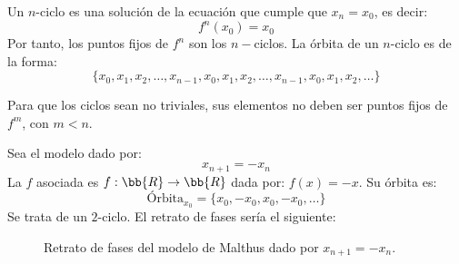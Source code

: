 \begin{definicion}[Ciclos]
Un $n$-ciclo es una solución de la ecuación que cumple que $x_n = x_0$, es decir:
$$f^n(x_0) = x_0$$
Por tanto, los puntos fijos de $f^n$ son los $n-$ciclos. La órbita de un $n$-ciclo es de la forma:
$$\{x_0, x_1, x_2, \ldots, x_{n-1}, x_0, x_1, x_2, \ldots, x_{n-1}, x_0, x_1, x_2, \ldots \}$$

Para que los ciclos sean no triviales, sus elementos no deben ser puntos fijos de $f^m$, con $m<n$.
\end{definicion}

\begin{ejemplo}
    Sea el modelo dado por:
    $$x_{n+1} = -x_n$$
    La $f$ asociada es $f:\bb{R} \rightarrow \bb{R}$ dada por: $f(x) = -x$. Su órbita es:
    $$\text{Órbita}_{x_0} = \{x_0, -x_0, x_0, -x_0, \ldots \}$$
    Se trata de un $2$-ciclo. El retrato de fases sería el siguiente:
    \begin{figure}[H]
        \centering
        \caption{Retrato de fases del modelo de Malthus dado por $x_{n+1}=-x_n$.}
    \end{figure}
\end{ejemplo}

